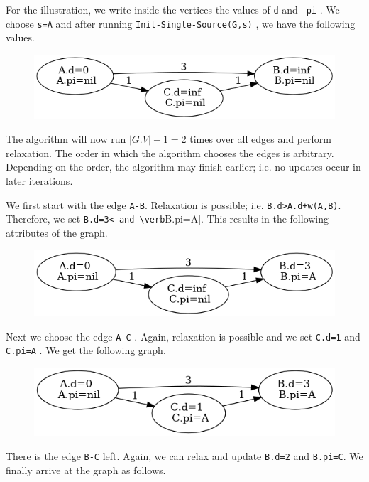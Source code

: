 For the illustration, we write inside the vertices the values of \verb|d| and \verb| pi| . We choose \verb|s=A| and after running \verb|Init-Single-Source(G,s)| , we have the following values.

\begin{figure}[H]
\centering
\includegraphics[scale=0.5]{images/sssp_6.png}
\end{figure}

The algorithm will now run $|G.V|-1 = 2$ times over all edges and perform relaxation. The order in which the algorithm chooses the edges is arbitrary. Depending on the order, the algorithm may finish earlier; i.e. no updates occur in later iterations.

We first start with the edge \verb|A-B|. Relaxation is possible; i.e. \verb|B.d>A.d+w(A,B)|. Therefore, we set \verb|B.d=3< and \verb|B.pi=A|. This results in the following attributes of the graph.

\begin{figure}[H]
\centering
\includegraphics[scale=0.5]{images/sssp_7.png}
\end{figure}

Next we choose the edge \verb|A-C| . Again, relaxation is possible and we set \verb|C.d=1| and \verb|C.pi=A| . We get the following graph.

\begin{figure}[H]
\centering
\includegraphics[scale=0.5]{images/sssp_8.png}
\end{figure}

There is the edge \verb|B-C| left. Again, we can relax and update \verb|B.d=2| and \verb|B.pi=C|. We finally arrive at the graph as follows.

